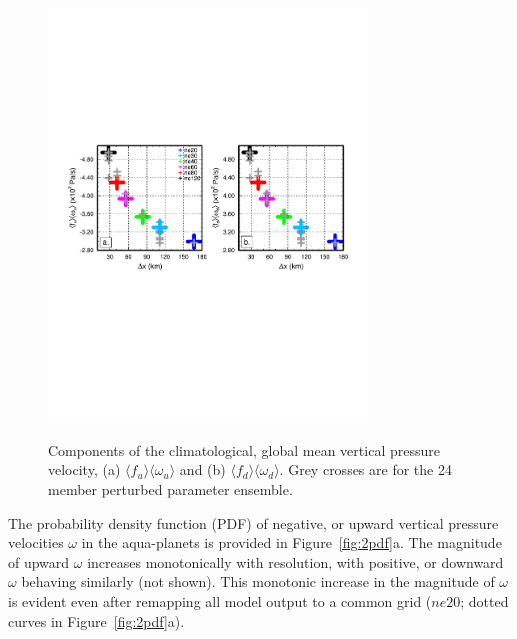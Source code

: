 \documentclass[times]{qjrms4}
\begin{document}
\begin{figure}
\begin{center}
\noindent\includegraphics[width=20pc,angle=0]{figs/temp_diags_2panel.pdf}\\
\end{center}
\caption{Components of the climatological, global mean vertical pressure velocity, (a) $\langle f_{u} \rangle \langle \omega_{u} \rangle$ and (b) $\langle f_{d} \rangle \langle \omega_{d} \rangle$. Grey crosses are for the 24 member perturbed parameter ensemble.}
\label{fig:2panel}
\end{figure}

The probability density function (PDF) of negative, or upward vertical pressure velocities $\omega$ in the aqua-planets is provided in Figure~\ref{fig:2pdf}a. The magnitude of upward $\omega$ increases monotonically with resolution, with positive, or downward $\omega$ behaving similarly (not shown). This monotonic increase in the magnitude of $\omega$ is evident even after remapping all model output to a common grid ($ne20$; dotted curves in Figure~\ref{fig:2pdf}a).
\end{document}
